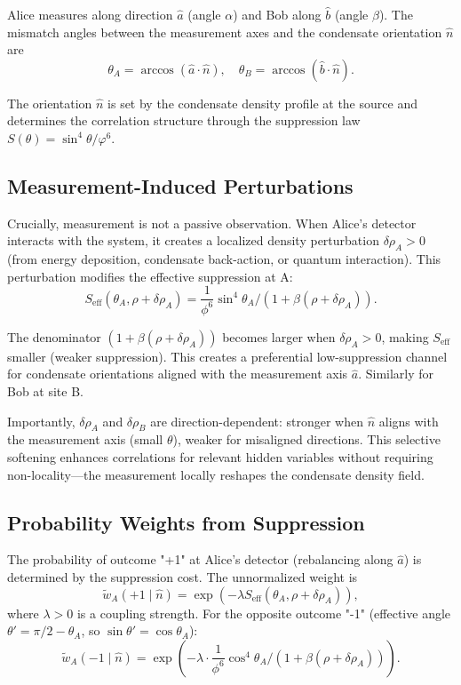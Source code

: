 \documentclass[11pt,a4paper]{article}
\theoremstyle{definition}
\theoremstyle{remark}
\newcommand{\vp}{\varphi}
\begin{document}
Alice measures along direction $\hat{a}$ (angle $\alpha$) and Bob along $\hat{b}$ (angle $\beta$). The mismatch angles between the measurement axes and the condensate orientation $\hat{n}$ are
\begin{equation}
\theta_A = \arccos(\hat{a} \cdot \hat{n}), \quad \theta_B = \arccos(\hat{b} \cdot \hat{n}).
\label{P8:eq:mismatch_angles}
\end{equation}

The orientation $\hat{n}$ is set by the condensate density profile at the source and determines the correlation structure through the suppression law $S(\theta)=\sin^4\!\theta/\vp^6$.


\subsection{Measurement-Induced Perturbations}

Crucially, measurement is not a passive observation. When Alice's detector interacts with the system, it creates a localized density perturbation $\delta\rho_A > 0$ (from energy deposition, condensate back-action, or quantum interaction). This perturbation modifies the effective suppression at A:
\begin{equation}
S_{\mathrm{eff}}(\theta_A, \rho + \delta\rho_A) = \frac{1}{\phi^6} \sin^4\theta_A \Big/ (1 + \beta (\rho + \delta\rho_A)).
\label{P8:eq:seff_perturbed}
\end{equation}

The denominator $(1 + \beta(\rho + \delta\rho_A))$ becomes larger when $\delta\rho_A > 0$, making $S_{\mathrm{eff}}$ smaller (weaker suppression). This creates a preferential low-suppression channel for condensate orientations aligned with the measurement axis $\hat{a}$. Similarly for Bob at site B.

Importantly, $\delta\rho_A$ and $\delta\rho_B$ are direction-dependent: stronger when $\hat{n}$ aligns with the measurement axis (small $\theta$), weaker for misaligned directions. This selective softening enhances correlations for relevant hidden variables without requiring non-locality---the measurement locally reshapes the condensate density field.

\subsection{Probability Weights from Suppression}

The probability of outcome "+1" at Alice's detector (rebalancing along $\hat{a}$) is determined by the suppression cost. The unnormalized weight is
\begin{equation}
\tilde{w}_A(+1 \mid \hat{n}) = \exp\left( -\lambda S_{\mathrm{eff}}(\theta_A, \rho + \delta\rho_A) \right),
\label{P8:eq:weight_plus}
\end{equation}
where $\lambda > 0$ is a coupling strength. For the opposite outcome "-1" (effective angle $\theta' = \pi/2 - \theta_A$, so $\sin\theta' = \cos\theta_A$):
\begin{equation}
\tilde{w}_A(-1 \mid \hat{n}) = \exp\left( -\lambda \cdot \frac{1}{\phi^6} \cos^4\theta_A \Big/ (1 + \beta (\rho + \delta\rho_A)) \right).
\label{P8:eq:weight_minus}
\end{equation}
\end{document}
